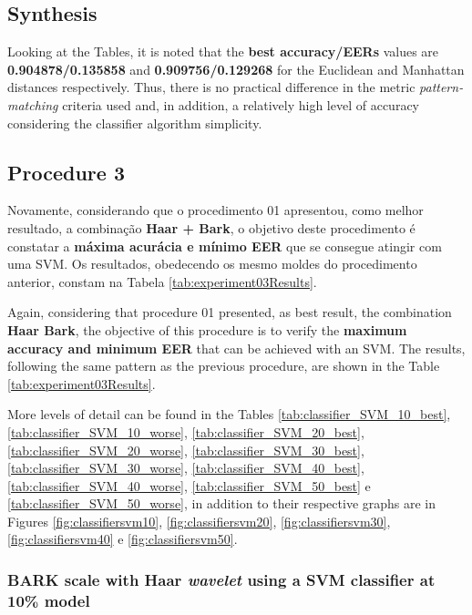 	\subsection{Synthesis}
		\par Looking at the Tables, it is noted that the \textbf{best accuracy/EERs} values are \textbf{0.904878/0.135858} and \textbf{0.909756/0.129268} for the Euclidean and Manhattan distances respectively. Thus, there is no practical difference in the metric \textit{pattern-matching} criteria used and, in addition, a relatively high level of accuracy considering the classifier algorithm simplicity.
		
	\subsection{Procedure 3}
		\label{chap:testsResults:sec:Experimento03}
		\par Novamente, considerando que o procedimento 01 apresentou, como melhor resultado, a combinação \textbf{Haar + Bark}, o objetivo deste procedimento é constatar a \textbf{máxima acurácia e mínimo EER} que se consegue atingir com uma SVM. Os resultados, obedecendo os mesmo moldes do procedimento anterior, constam na Tabela \ref{tab:experiment03Results}.
		
		\par Again, considering that procedure 01 presented, as best result, the combination \textbf{Haar Bark}, the objective of this procedure is to verify the \textbf{maximum accuracy and minimum EER} that can be achieved with an SVM. The results, following the same pattern as the previous procedure, are shown in the Table \ref{tab:experiment03Results}.
		
		
		\par More levels of detail can be found in the Tables
		 \ref{tab:classifier_SVM_10_best}, \ref{tab:classifier_SVM_10_worse}, \ref{tab:classifier_SVM_20_best}, \ref{tab:classifier_SVM_20_worse}, \ref{tab:classifier_SVM_30_best}, \ref{tab:classifier_SVM_30_worse}, \ref{tab:classifier_SVM_40_best}, \ref{tab:classifier_SVM_40_worse}, \ref{tab:classifier_SVM_50_best} e \ref{tab:classifier_SVM_50_worse}, in addition to their respective graphs are in Figures \ref{fig:classifiersvm10}, \ref{fig:classifiersvm20}, \ref{fig:classifiersvm30}, \ref{fig:classifiersvm40} e \ref{fig:classifiersvm50}.
		
		
		
		\subsubsection{BARK scale with Haar \textit{wavelet} using a SVM classifier at 10\% model}
			
